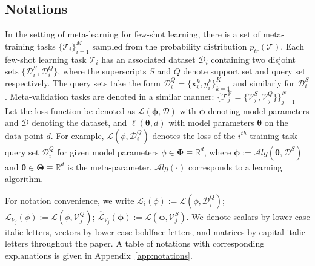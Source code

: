 \subsection{Notations}
In the setting of meta-learning for few-shot learning, there is a set of meta-training tasks $\{\mathcal{T}_i\}_{i=1}^M$ sampled from the probability distribution 
$p_{tr}(\mathcal{T})$. Each few-shot learning task $\mathcal{T}_i$ has an associated dataset $\mathcal{D}_i$ containing two disjoint sets $\{\mathcal{D}^{S}_{i},\mathcal{D}^{Q}_{i}\}$, where the superscripts $S$ and $Q$ denote support set and query set respectively. The query sets take the form $\mathcal{D}^{Q}_{i} = \{\boldsymbol{x}_i^k, {y}_i^k\}_{k=1}^K$ and similarly for $\mathcal{D}^{S}_{i}$. Meta-validation tasks are denoted in a similar manner: $\{\mathcal{T}^{\mathcal{V}}_{j}= \{\mathcal{V}_{j}^{S}, \mathcal{V}_{j}^{Q}\} \}_{j = 1} ^ {N}$
Let the loss function be denoted as $\mathcal{L}(\boldsymbol{\phi}, \mathcal{D})$ with $\boldsymbol{\phi}$  denoting model parameters and $\mathcal{D}$ denoting the dataset, and $\ell(\boldsymbol{\theta}, d)$ with model parameters $\boldsymbol{\theta}$ on the data-point $d$. For example, $\mathcal{L}(\phi, \mathcal{D}_i^{Q})$ denotes the loss of the $i^{th}$ training task query set $\mathcal{D}_i^{Q}$ for given model parameters $\phi \in \boldsymbol{\Phi}\equiv \mathbb{R}^d$, where $\boldsymbol{\phi}:=\mathcal{A}lg(\boldsymbol{\theta}, \mathcal{D}^S)$ and $\boldsymbol{\theta}\in \boldsymbol{\Theta} \equiv \mathbb{R}^d$ is the meta-parameter. $\mathcal{A}lg(\cdot)$ corresponds to a learning algorithm.


For notation convenience, we write $\mathcal{L}_i(\phi) := \mathcal{L}(\phi, \mathcal{D}_i^{Q})$; $\mathcal{L}_{V_j}(\phi):=\mathcal{L}(\phi, \mathcal{V}_j^{Q})$;  $\widehat{\mathcal{L}}_{V_j}(\boldsymbol{\phi}) := \mathcal{L}(\boldsymbol{\phi}, \mathcal{V}_j^{S})$. We denote scalars by lower case italic letters, vectors by lower case boldface letters, and matrices by capital italic letters throughout the paper. A table of notations with corresponding explanations is given in Appendix~\ref{app:notations}.

